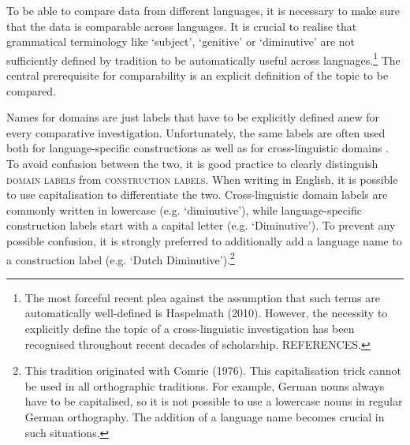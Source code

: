 \label{ch:languagecomparison}

To be able to compare data from different languages, it is necessary to make sure that the data is comparable across languages. It is crucial to realise that grammatical terminology like `subject', `genitive' or `diminutive' are not sufficiently defined by tradition to be automatically useful across languages.\footnote{The most forceful recent plea against the assumption that such terms are automatically well-defined is Haspelmath (2010). However, the necessity to explicitly define the topic of a cross-linguistic investigation has been recognised throughout recent decades of scholarship. REFERENCES.} The central prerequisite for comparability is an explicit definition of the topic to be compared.

%
Names for domains are just labels that have to be explicitly defined anew for every comparative investigation. Unfortunately, the same labels are often used both for language-specific constructions  as well as for cross-linguistic domains . To avoid confusion between the two, it is good practice to clearly distinguish \textsc{domain labels} from \textsc{construction labels}. When writing in English, it is possible to use capitalisation to differentiate the two. Cross-linguistic domain labels are commonly written in lowercase (e.g. `diminutive'), while language-specific construction labels start with a capital letter (e.g. `Diminutive'). To prevent any possible confusion, it is strongly preferred to additionally add a language name  to a construction label (e.g. `Dutch Diminutive').\footnote{This tradition originated with Comrie (1976). This capitalisation trick cannot be used in all orthographic traditions. For example, German nouns always have to be capitalised, so it is not possible to use a lowercase nouns in regular German orthography. The addition of a language name becomes crucial in such situations.}

